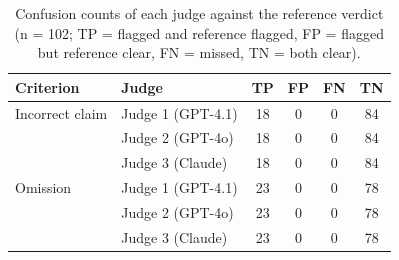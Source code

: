 \begin{table}[H]
\centering
{\footnotesize{}\setlength{\tabcolsep}{4pt}
\caption{Confusion counts of each judge against the reference verdict (n = 102; TP = flagged and reference flagged, FP = flagged but reference clear, FN = missed, TN = both clear).}
\label{tab:judge-confusion}
\begin{tabular}{llcccc}
\toprule
Criterion & Judge & TP & FP & FN & TN \\
\midrule
Incorrect claim & Judge 1 (GPT-4.1) & 18 & 0 & 0 & 84 \\
 & Judge 2 (GPT-4o) & 18 & 0 & 0 & 84 \\
 & Judge 3 (Claude) & 18 & 0 & 0 & 84 \\
\midrule
Omission & Judge 1 (GPT-4.1) & 23 & 0 & 0 & 78 \\
 & Judge 2 (GPT-4o) & 23 & 0 & 0 & 78 \\
 & Judge 3 (Claude) & 23 & 0 & 0 & 78 \\
\bottomrule
\end{tabular}}
\end{table}
